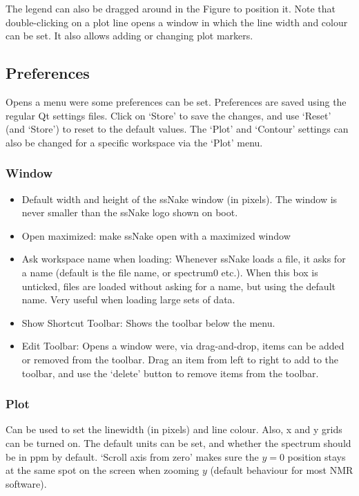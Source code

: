 \documentclass[11pt,a4paper]{article}
\begin{document}
The legend can also be dragged around in the Figure to position it. Note that double-clicking on a plot
line opens a window in which the line width and colour can be set. It also allows adding or changing plot
markers.

\subsection{Preferences}
Opens a menu were some preferences can be set. Preferences are saved using the regular Qt settings files.
Click on `Store' to save the changes, and use `Reset' (and `Store') to reset to the default values. The `Plot'
and `Contour' settings can also be changed for a specific workspace via the `Plot' menu.

\subsubsection{Window}
\begin{itemize}
  \item Default width and height of the ssNake window (in pixels). The window is never smaller than the ssNake
	 logo shown on boot.
  \item Open maximized: make ssNake open with a maximized window
  \item Ask workspace name when loading: Whenever ssNake loads a file, it asks for a name (default is the file
	 name, or spectrum0 etc.). When this box is unticked, files are loaded without asking for a name, but using
	 the default name. Very useful when loading large sets of data.
  \item Show Shortcut Toolbar: Shows the toolbar below the menu.
  \item Edit Toolbar: Opens a window were, via drag-and-drop, items can be added or removed from the toolbar.
	 Drag an item from left to right to add to the toolbar, and use the `delete' button to remove items from
	 the toolbar.
\end{itemize}

\subsubsection{Plot}
Can be used to set the linewidth (in pixels) and line colour. Also, x and y grids can be turned on. The
default units can be set, and whether the spectrum should be in ppm by default. `Scroll axis from zero' makes
sure the $y=0$ position stays at the same spot on the screen when zooming $y$ (default behaviour for most NMR
software).
\end{document}
